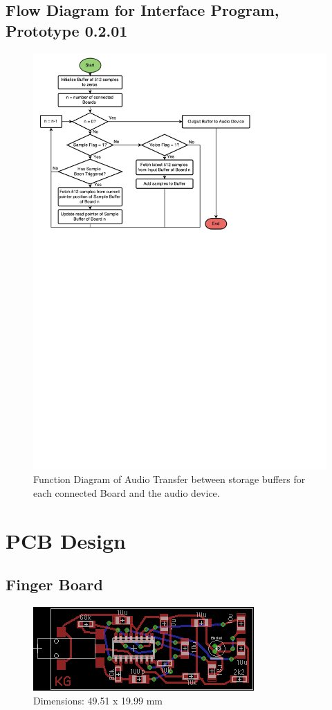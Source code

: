 \subsection{Flow Diagram for Interface Program, Prototype 0.2.01}
\label{juceflow}
\begin{figure}[H]
\centering
\includegraphics[scale=0.7]{Images/JuceFlow}\\
Function Diagram of Audio Transfer between storage buffers for each connected Board and the audio device.
\end{figure}


\section{PCB Design}

\subsection{Finger Board}
\label{fingerboardpcb}
\begin{figure}[H]
\centering
\includegraphics[scale = 2]{Images/mic_pcb_02}
\\ Dimensions: 49.51 x 19.99 mm
\end{figure}

